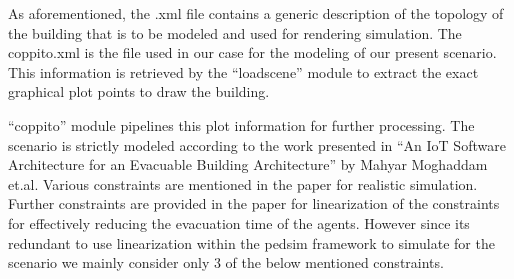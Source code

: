 As aforementioned, the .xml file contains a generic description of the topology of the building that is to be modeled and used for rendering simulation. The coppito.xml is the file used in our case for the modeling of our present scenario. This information is retrieved by the “loadscene” module to extract the exact graphical plot points to draw the building. 

“coppito” module pipelines this plot information for further processing. The scenario is strictly modeled according to the work presented in “An IoT Software Architecture for an Evacuable Building Architecture” by Mahyar Moghaddam et.al. Various constraints are mentioned in the paper for realistic simulation. Further constraints are provided in the paper for linearization of the constraints for effectively reducing the evacuation time of the agents. However since its redundant to use linearization within the pedsim framework to simulate for the scenario we mainly consider only 3 of the below mentioned constraints.



